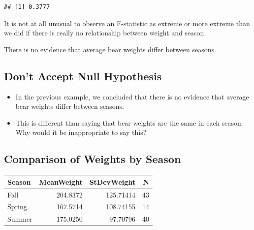 \documentclass[]{book}
\newenvironment{Shaded}{\begin{snugshade}}{\end{snugshade}}
\newcommand{\KeywordTok}[1]{\textcolor[rgb]{0.13,0.29,0.53}{\textbf{#1}}}
\newcommand{\DataTypeTok}[1]{\textcolor[rgb]{0.13,0.29,0.53}{#1}}
\newcommand{\StringTok}[1]{\textcolor[rgb]{0.31,0.60,0.02}{#1}}
\newcommand{\OperatorTok}[1]{\textcolor[rgb]{0.81,0.36,0.00}{\textbf{#1}}}
\newcommand{\NormalTok}[1]{#1}
\begin{document}
\begin{verbatim}
## [1] 0.3777
\end{verbatim}

It is not at all unusual to observe an F-statistic as extreme or more
extreme than we did if there is really no relationship between weight
and season.

There is no evidence that average bear weights differ between seasons.

\subsection{Don't Accept Null
Hypothesis}\label{dont-accept-null-hypothesis}

\begin{itemize}
\item
  In the previous example, we concluded that there is no evidence that
  average bear weights differ between seasons.
\item
  This is different than saying that bear weights are the same in each
  season. Why would it be inappropriate to say this?
\end{itemize}

\subsection{Comparison of Weights by
Season}\label{comparison-of-weights-by-season}

\begin{Shaded}
\end{Shaded}

\begin{tabular}{l|r|r|r}
\hline
Season & MeanWeight & StDevWeight & N\\
\hline
Fall & 204.8372 & 125.71414 & 43\\
\hline
Spring & 167.5714 & 108.74155 & 14\\
\hline
Summer & 175.0250 & 97.70796 & 40\\
\hline
\end{tabular}
\end{document}
